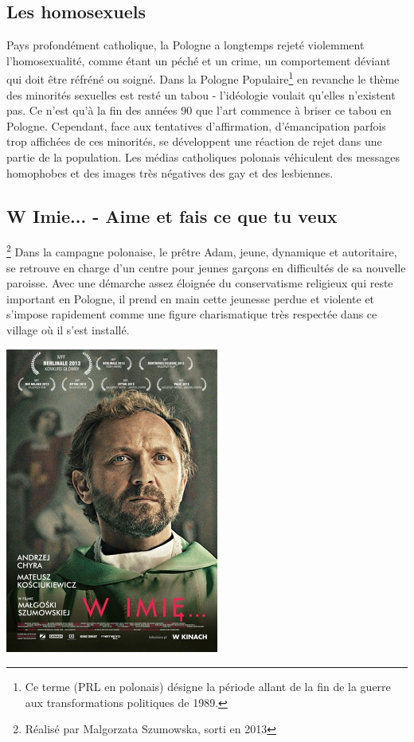 \documentclass[12pt]{amsart}
\begin{document}
\begin{multicols}{2}
\section{Les homosexuels}
Pays profondément catholique, la Pologne a longtemps rejeté violemment l’homosexualité, comme étant un péché et un crime, un comportement déviant qui doit être réfréné ou soigné. Dans la Pologne Populaire\footnote{Ce terme (PRL en polonais) désigne la période allant de la fin de la guerre aux transformations politiques de 1989.} en revanche le thème des minorités sexuelles est resté un tabou - l'idéologie voulait qu'elles n'existent pas. Ce n'est qu'à la fin des années 90 que l'art commence à briser ce tabou en Pologne. Cependant, face aux tentatives d'affirmation, d'émancipation parfois trop affichées de ces minorités, se développent une réaction de rejet dans une partie de la population. Les médias catholiques polonais véhiculent des messages homophobes et des images très négatives des gay et des lesbiennes.

\subsection*{W Imie... - Aime et fais ce que tu veux}\footnote{Réalisé par Malgorzata Szumowska, sorti en 2013}
Dans la campagne polonaise, le prêtre Adam, jeune, dynamique et autoritaire, se retrouve en charge d’un centre pour jeunes garçons en difficultés de sa nouvelle paroisse. Avec une démarche assez éloignée du conservatisme religieux qui reste important en Pologne, il prend en main cette jeunesse perdue et violente et s’impose rapidement comme une figure charismatique très respectée dans ce village où il s’est installé. \\

\begingroup
\centering

\includegraphics[width=7cm]{wimie.jpg}


\end{multicols}
\end{document}

